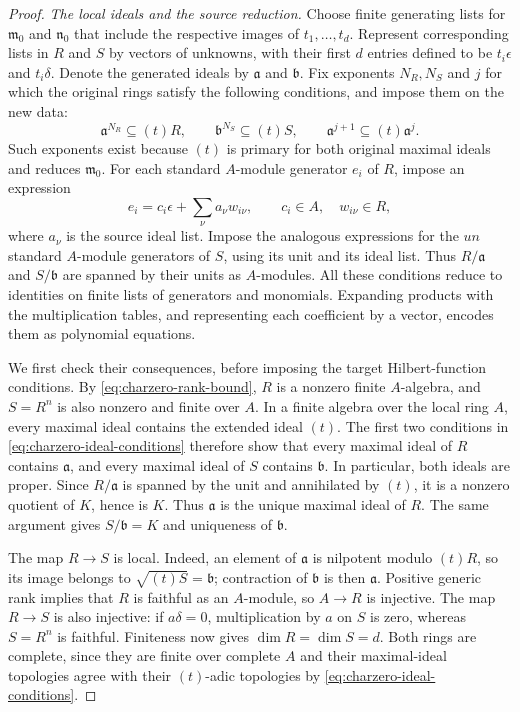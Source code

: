 \begin{proof}
\smallskip
\noindent\emph{The local ideals and the source reduction.}
Choose finite generating lists for $\mathfrak m_0$ and
$\mathfrak n_0$ that include the respective images of $t_1,\ldots,t_d$.
Represent corresponding lists in $R$ and $S$ by vectors of
unknowns, with their first $d$ entries defined to be
$t_i\epsilon$ and $t_i\delta$.  Denote the generated ideals by
$\mathfrak a$ and $\mathfrak b$.  Fix exponents $N_R,N_S$ and $j$
for which the original rings satisfy the following conditions, and
impose them on the new data:
\begin{equation}\label{eq:charzero-ideal-conditions}
 \mathfrak a^{N_R}\subseteq(t)R,\qquad
 \mathfrak b^{N_S}\subseteq(t)S,\qquad
 \mathfrak a^{j+1}\subseteq(t)\mathfrak a^j.
\end{equation}
Such exponents exist because $(t)$ is primary for both original
maximal ideals and reduces $\mathfrak m_0$.
For each standard $A$-module generator $e_i$ of $R$, impose an
expression
\[
 e_i=c_i\epsilon+\sum_\nu a_\nu w_{i\nu},
 \qquad c_i\in A,\quad w_{i\nu}\in R,
\]
where $a_\nu$ is the source ideal list.  Impose the analogous
expressions for the $un$ standard $A$-module generators of $S$,
using its unit and its ideal list.  Thus $R/\mathfrak a$ and
$S/\mathfrak b$ are spanned by their units as $A$-modules.
All these conditions reduce to identities on finite lists of
generators and monomials.  Expanding products with the multiplication
tables, and representing each coefficient by a vector, encodes them
as polynomial equations.

We first check their consequences, before imposing the target
Hilbert-function conditions.  By \eqref{eq:charzero-rank-bound}, $R$
is a nonzero finite $A$-algebra, and $S=R^n$ is also nonzero and
finite over $A$.  In a finite algebra over the local ring $A$, every
maximal ideal contains the extended ideal $(t)$.  The first two
conditions in \eqref{eq:charzero-ideal-conditions} therefore show
that every maximal ideal of $R$ contains $\mathfrak a$, and every
maximal ideal of $S$ contains $\mathfrak b$.  In particular, both
ideals are proper.  Since $R/\mathfrak a$ is spanned by the unit and
annihilated by $(t)$, it is a nonzero quotient of $K$, hence is $K$.
Thus $\mathfrak a$ is the unique maximal ideal of $R$.  The same
argument gives $S/\mathfrak b=K$ and uniqueness of $\mathfrak b$.

The map $R\to S$ is local.  Indeed, an element of $\mathfrak a$
is nilpotent modulo $(t)R$, so its image belongs to
$\sqrt{(t)S}=\mathfrak b$; contraction of $\mathfrak b$ is then
$\mathfrak a$.  Positive generic rank implies that $R$ is faithful
as an $A$-module, so $A\to R$ is injective.  The map $R\to S$ is
also injective: if $a\delta=0$, multiplication by $a$ on $S$ is
zero, whereas $S=R^n$ is faithful.  Finiteness now gives
$\dim R=\dim S=d$.  Both rings are complete, since they are finite
over complete $A$ and their maximal-ideal topologies agree with their
$(t)$-adic topologies by \eqref{eq:charzero-ideal-conditions}.


\end{proof}
